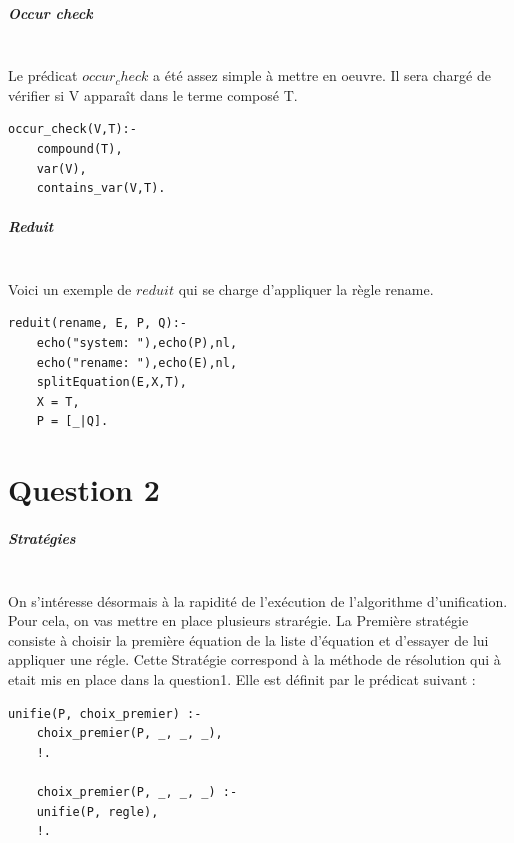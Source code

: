 \documentclass[10pt,a4paper]{report}
\begin{document}
\paragraph{Occur check} ~\\
Le prédicat $occur_check$ a été assez simple à mettre en oeuvre. Il sera chargé de vérifier si V apparaît dans le terme composé T.
\begin{lstlisting}[caption ={Dans le fichier $main.pl$}]
occur_check(V,T):-
	compound(T),
	var(V),
	contains_var(V,T).
\end{lstlisting}

\paragraph{Reduit} ~\\
Voici un exemple de $reduit$ qui se charge d'appliquer la règle rename.
\begin{lstlisting}[caption ={reduit dans $main.pl$}]
reduit(rename, E, P, Q):-
	echo("system: "),echo(P),nl,
	echo("rename: "),echo(E),nl,
	splitEquation(E,X,T),
	X = T,
	P = [_|Q].
\end{lstlisting}





\chapter*{Question 2}
\paragraph{Stratégies} ~\\
On s'intéresse désormais à la rapidité de l'exécution de l'algorithme d'unification.
Pour cela, on vas mettre en place plusieurs strarégie.
\newline
La Première stratégie consiste à choisir la première équation de la liste d'équation et d'essayer de lui appliquer une régle. Cette Stratégie correspond à la méthode de résolution qui à etait mis en place dans la question1. Elle est définit par le prédicat suivant :
\begin{lstlisting}[caption ={Stratégie choix premier dans $main.pl$}]
% unification choix premier
unifie(P, choix_premier) :- 
	choix_premier(P, _, _, _),
	!.
	
	choix_premier(P, _, _, _) :- 
	unifie(P, regle),
	!.
\end{lstlisting} ~\\
\end{document}
